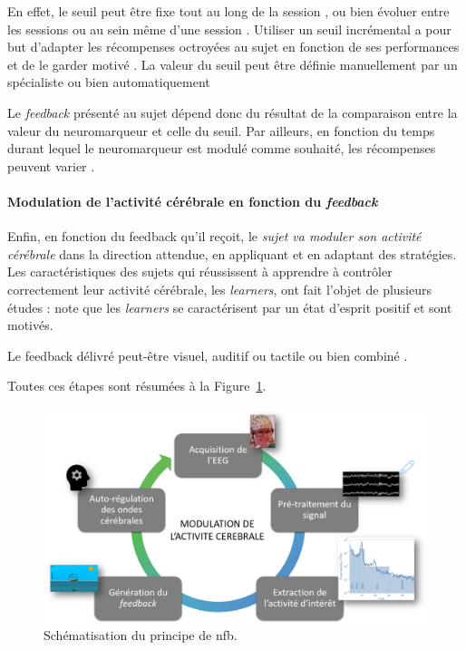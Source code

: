 En effet, le seuil peut être fixe tout au long de la session \citep{Kropotov2005, Monastra2002}, ou bien évoluer entre les sessions ou au sein même d'une session \citep{ 
Christiansen2014}. Utiliser un seuil incrémental a pour but d'adapter les récompenses octroyées au sujet en fonction de ses performances et 
de le garder motivé \citep{Bauer2016, Lansbergen2011}. La valeur du seuil peut être définie manuellement par un spécialiste ou bien automatiquement \citep{Arns2014}

Le \textit{feedback} présenté au sujet dépend donc du résultat de la comparaison entre la valeur du neuromarqueur et celle du seuil. Par ailleurs, en fonction du temps durant lequel
le neuromarqueur est modulé comme souhaité, les récompenses peuvent varier \citep{Bioulac2019}. 

\paragraph{Modulation de l'activité cérébrale en fonction du \textit{feedback}}
Enfin, en fonction du feedback qu'il reçoit, le \textit{sujet va moduler son activité cérébrale} dans la direction attendue, en appliquant et en adaptant des stratégies. 
Les caractéristiques des sujets qui réussissent à apprendre à contrôler correctement leur activité cérébrale, les \textit{learners}, ont fait l'objet de plusieurs études : 
\citet{Friedrich2014} note que les \textit{learners} se caractérisent par un état d'esprit positif et sont motivés. 

Le feedback délivré peut-être visuel, auditif ou tactile ou bien combiné \citep{Vernon2004}.

Toutes ces étapes sont résumées à la Figure~\ref{Figure:introduction_nfb_explications}.

\begin{figure}[h!]
  \centering
	\includegraphics[width=1\linewidth]{figures/chapter-1/introduction-nfb-explication} 
  \caption{Schématisation du principe de \gls{nfb}.}
  \label{Figure:introduction_nfb_explications}
\end{figure}

